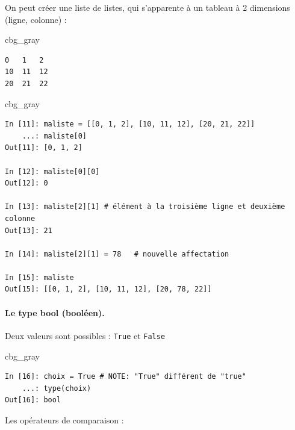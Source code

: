 \documentclass[%
oneside,                 %
final,                   %
10pt]{article}
\newenvironment{_cod_tight}[1]{
   \def\FrameCommand{\colorbox{#1}}
   \FrameRule0.6pt\MakeFramed {\FrameRestore}\vskip3mm}
   {\vskip0mm\endMakeFramed}
\newenvironment{cod}[1]{
\bgroup\rmfamily
\fboxsep=0mm\relax
\begin{_cod_tight}{#1}
\list{}{\parsep=-2mm\parskip=0mm\topsep=0pt\leftmargin=2mm
\rightmargin=2\leftmargin\leftmargin=4pt\relax}
\item\relax}
{\endlist\end{_cod_tight}\egroup}
\begin{document}
On peut créer une liste de listes, qui s'apparente à un tableau à 2 dimensions (ligne, colonne) :

\begin{cod}{cbg_gray}\begin{verbatim}
0   1   2
10  11  12
20  21  22
\end{verbatim}
\end{cod}
\noindent

\begin{cod}{cbg_gray}\begin{verbatim}
In [11]: maliste = [[0, 1, 2], [10, 11, 12], [20, 21, 22]]
    ...: maliste[0]
Out[11]: [0, 1, 2]

In [12]: maliste[0][0]
Out[12]: 0

In [13]: maliste[2][1] # élément à la troisième ligne et deuxième colonne
Out[13]: 21

In [14]: maliste[2][1] = 78   # nouvelle affectation

In [15]: maliste
Out[15]: [[0, 1, 2], [10, 11, 12], [20, 78, 22]]
\end{verbatim}
\end{cod}
\noindent

\paragraph{Le type bool (booléen).}
Deux valeurs sont possibles : \texttt{True} et \texttt{False}

\begin{cod}{cbg_gray}\begin{verbatim}
In [16]: choix = True # NOTE: "True" différent de "true"
    ...: type(choix)
Out[16]: bool
\end{verbatim}
\end{cod}
\noindent

Les opérateurs de comparaison :
\end{document}
